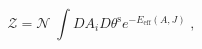 \begin{equation}
\mathcal{Z}=\mathcal{N\;}\int DA_{i}D\theta ^{\mathrm{s}}e^{-E_{\mathrm{eff}%
}(A,J)}\;,  \label{pf}
\end{equation}

